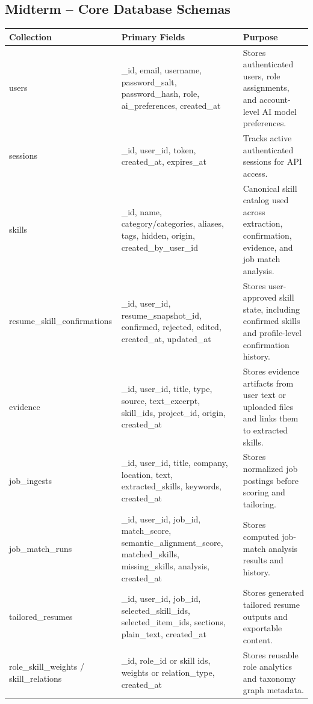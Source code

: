 \documentclass[11pt]{article}
\begin{document}
\subsection*{Midterm -- Core Database Schemas}

\begin{table}[H]
  \renewcommand{\arraystretch}{1.2}
  \begin{tabularx}{\linewidth}{@{}p{1.5in}Y Y@{}}
    \toprule
    \textbf{Collection} & \textbf{Primary Fields} & \textbf{Purpose} \\
    \midrule
    users & \_id, email, username, password\_salt, password\_hash, role, ai\_preferences, created\_at & Stores authenticated users, role assignments, and account-level AI model preferences. \\
    sessions & \_id, user\_id, token, created\_at, expires\_at & Tracks active authenticated sessions for API access. \\
    skills & \_id, name, category/categories, aliases, tags, hidden, origin, created\_by\_user\_id & Canonical skill catalog used across extraction, confirmation, evidence, and job match analysis. \\
    resume\_skill\_confirmations & \_id, user\_id, resume\_snapshot\_id, confirmed, rejected, edited, created\_at, updated\_at & Stores user-approved skill state, including confirmed skills and profile-level confirmation history. \\
    evidence & \_id, user\_id, title, type, source, text\_excerpt, skill\_ids, project\_id, origin, created\_at & Stores evidence artifacts from user text or uploaded files and links them to extracted skills. \\
    job\_ingests & \_id, user\_id, title, company, location, text, extracted\_skills, keywords, created\_at & Stores normalized job postings before scoring and tailoring. \\
    job\_match\_runs & \_id, user\_id, job\_id, match\_score, semantic\_alignment\_score, matched\_skills, missing\_skills, analysis, created\_at & Stores computed job-match analysis results and history. \\
    tailored\_resumes & \_id, user\_id, job\_id, selected\_skill\_ids, selected\_item\_ids, sections, plain\_text, created\_at & Stores generated tailored resume outputs and exportable content. \\
    role\_skill\_weights / skill\_relations & \_id, role\_id or skill ids, weights or relation\_type, created\_at & Stores reusable role analytics and taxonomy graph metadata. \\
    \bottomrule
  \end{tabularx}
\end{table}
\end{document}
